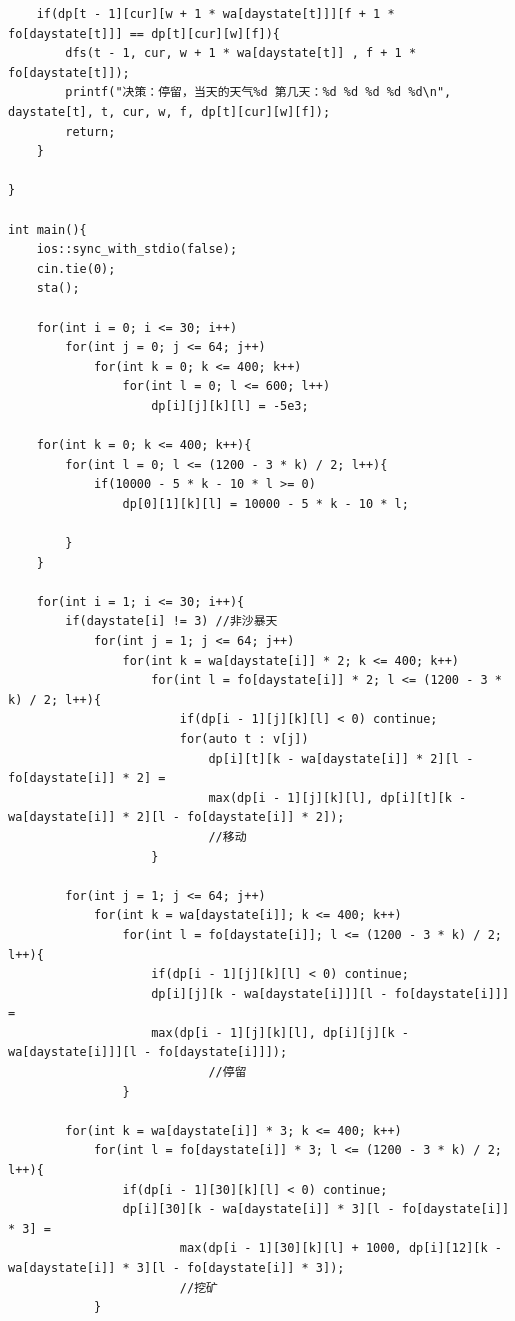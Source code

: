\begin{verbatim}
    if(dp[t - 1][cur][w + 1 * wa[daystate[t]]][f + 1 * fo[daystate[t]]] == dp[t][cur][w][f]){
        dfs(t - 1, cur, w + 1 * wa[daystate[t]] , f + 1 * fo[daystate[t]]);
        printf("决策：停留，当天的天气%d 第几天：%d %d %d %d %d\n", daystate[t], t, cur, w, f, dp[t][cur][w][f]);
        return;
    }
    
}

int main(){
    ios::sync_with_stdio(false);
    cin.tie(0);
    sta();
    
    for(int i = 0; i <= 30; i++)
        for(int j = 0; j <= 64; j++)
            for(int k = 0; k <= 400; k++)
                for(int l = 0; l <= 600; l++)
                    dp[i][j][k][l] = -5e3;

    for(int k = 0; k <= 400; k++){
        for(int l = 0; l <= (1200 - 3 * k) / 2; l++){
            if(10000 - 5 * k - 10 * l >= 0)
                dp[0][1][k][l] = 10000 - 5 * k - 10 * l;
            
        }
    }

    for(int i = 1; i <= 30; i++){
        if(daystate[i] != 3) //非沙暴天
            for(int j = 1; j <= 64; j++)
                for(int k = wa[daystate[i]] * 2; k <= 400; k++)   
                    for(int l = fo[daystate[i]] * 2; l <= (1200 - 3 * k) / 2; l++){
                        if(dp[i - 1][j][k][l] < 0) continue;
                        for(auto t : v[j])
                            dp[i][t][k - wa[daystate[i]] * 2][l - fo[daystate[i]] * 2] = 
                            max(dp[i - 1][j][k][l], dp[i][t][k - wa[daystate[i]] * 2][l - fo[daystate[i]] * 2]);
                            //移动
                    }
        
        for(int j = 1; j <= 64; j++)
            for(int k = wa[daystate[i]]; k <= 400; k++)   
                for(int l = fo[daystate[i]]; l <= (1200 - 3 * k) / 2; l++){
                    if(dp[i - 1][j][k][l] < 0) continue;
                    dp[i][j][k - wa[daystate[i]]][l - fo[daystate[i]]] = 
                    max(dp[i - 1][j][k][l], dp[i][j][k - wa[daystate[i]]][l - fo[daystate[i]]]);
                            //停留
                }

        for(int k = wa[daystate[i]] * 3; k <= 400; k++)   
            for(int l = fo[daystate[i]] * 3; l <= (1200 - 3 * k) / 2; l++){
                if(dp[i - 1][30][k][l] < 0) continue;
                dp[i][30][k - wa[daystate[i]] * 3][l - fo[daystate[i]] * 3] = 
                        max(dp[i - 1][30][k][l] + 1000, dp[i][12][k - wa[daystate[i]] * 3][l - fo[daystate[i]] * 3]);
                        //挖矿
            }
        

\end{verbatim}
